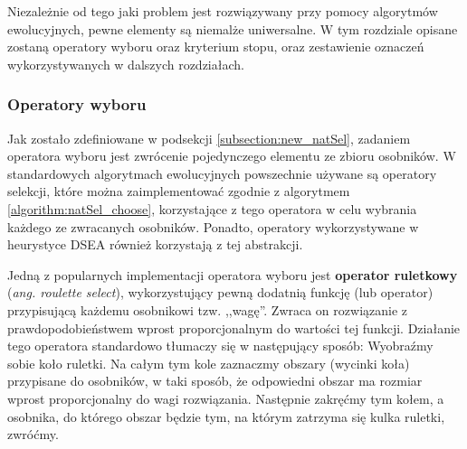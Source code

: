 \documentclass[./FM_mgr.tex]{subfiles}
\begin{document}
Niezależnie od tego jaki problem jest rozwiązywany przy pomocy algorytmów ewolucyjnych, pewne elementy są niemalże uniwersalne. 
W tym rozdziale opisane zostaną operatory wyboru oraz kryterium stopu, oraz zestawienie oznaczeń wykorzystywanych w dalszych rozdziałach.

\subsubsection{Operatory wyboru}

Jak zostało zdefiniowane w podsekcji \ref{subsection:new_natSel}, zadaniem operatora wyboru jest zwrócenie pojedynczego elementu ze zbioru osobników.
W standardowych algorytmach ewolucyjnych powszechnie używane są operatory selekcji, które można zaimplementować zgodnie z algorytmem \ref{algorithm:natSel_choose}, korzystające z tego operatora w celu wybrania każdego ze zwracanych osobników.
Ponadto, operatory wykorzystywane w heurystyce DSEA również korzystają z tej abstrakcji.

Jedną z popularnych implementacji operatora wyboru jest \textbf{operator ruletkowy} (\emph{ang. roulette select}), wykorzystujący pewną dodatnią funkcję (lub operator) przypisującą każdemu osobnikowi tzw. ,,wagę''.
Zwraca on rozwiązanie z prawdopodobieństwem wprost proporcjonalnym do wartości tej funkcji.
Działanie tego operatora standardowo tłumaczy się w następujący sposób:
Wyobraźmy sobie koło ruletki. 
Na całym tym kole zaznaczmy obszary (wycinki koła) przypisane do osobników, w taki sposób, że odpowiedni obszar ma rozmiar wprost proporcjonalny do wagi rozwiązania. 
Następnie zakręćmy tym kołem, a osobnika, do którego obszar będzie tym, na którym zatrzyma się kulka ruletki, zwróćmy.
\end{document}
